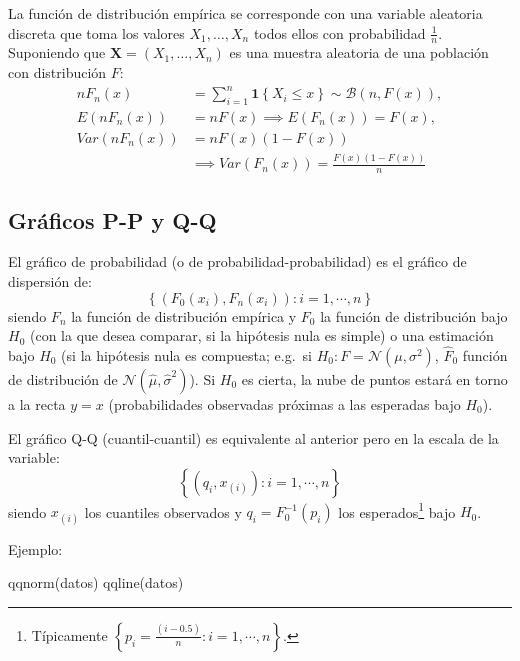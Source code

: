 \documentclass[
]{book}
\newenvironment{Shaded}{\begin{snugshade}}{\end{snugshade}}
\newcommand{\FunctionTok}[1]{\textcolor[rgb]{0.00,0.00,0.00}{#1}}
\newcommand{\NormalTok}[1]{#1}
\theoremstyle{break}
\theoremstyle{nonumberplain}
\begin{document}
La función de distribución empírica se corresponde con una variable aleatoria discreta que toma los valores
\(X_1,\ldots ,X_n\) todos ellos con probabilidad \(\frac{1}{n}\).
Suponiendo que \(\mathbf{X}=\left( X_1,\ldots ,X_n \right)\) es una muestra aleatoria de una población con distribución \(F\):
\[\begin{aligned}
nF_n\left( x \right) &= \sum_{i=1}^{n}\mathbf{1}\left\{ X_i\leq x\right\}
\sim \mathcal{B}\left( n,F\left( x \right) \right), \\
E\left( nF_n\left( x \right) \right) &= nF\left( x \right) \implies E\left(
F_n\left( x \right) \right) =F\left( x \right), \\
Var\left( nF_n\left( x \right) \right) &=  nF\left( x \right) \left(
1-F\left( x \right) \right) \\
&\implies  Var\left( F_n\left( x \right) \right) =\frac{F\left( x \right) \left( 1-F\left( x \right) \right)}{n}
\end{aligned}\]

\hypertarget{gruxe1ficos-p-p-y-q-q}{%
\subsection{Gráficos P-P y Q-Q}\label{gruxe1ficos-p-p-y-q-q}}

El gráfico de probabilidad (o de probabilidad-probabilidad) es el gráfico de dispersión de:
\[\left \{  \left( F_0(x_{i}), F_n(x_{i}) \right)  :i=1,\cdots,n\right \}\]
siendo \(F_n\) la función de distribución empírica y \(F_0\) la función de distribución bajo \(H_0\) (con la que desea comparar, si la hipótesis nula es simple) o una estimación bajo \(H_0\) (si la hipótesis nula es compuesta; e.g.~si \(H_0:F= \mathcal{N}(\mu,\sigma^2)\),
\(\hat{F}_0\) función de distribución de \(\mathcal{N}(\hat{\mu},\hat{\sigma}^2)\)).
Si \(H_0\) es cierta, la nube de puntos estará en torno a la recta \(y=x\) (probabilidades observadas próximas a las esperadas bajo \(H_0\)).

El gráfico Q-Q (cuantil-cuantil) es equivalente al anterior pero en la escala de la variable:
\[\left\{ \left( q_{i}, x_{(i)}\right) : i=1, \cdots, n \right\}\]
siendo \(x_{(i)}\) los cuantiles observados y \(q_{i}=F_0^{-1}(p_{i})\) los esperados\footnote{Típicamente \(\left \{ p_{i}=\frac{\left(i-0.5 \right)}n : i=1, \cdots, n \right\}\).} bajo \(H_0\).

Ejemplo:

\begin{Shaded}
\begin{Highlighting}[]
\FunctionTok{qqnorm}\NormalTok{(datos)}
\FunctionTok{qqline}\NormalTok{(datos)}
\end{Highlighting}
\end{Shaded}
\end{document}

